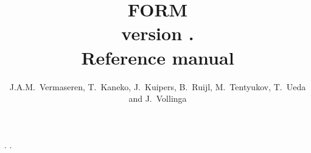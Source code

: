 \documentclass[11pt]{report}
\newcommand{\emptypage}{\newpage \thispagestyle{empty} \tiny{.} \normalsize}
\newcommand{\clearemptydoublepage}{\newpage{\pagestyle{empty}\cleardoublepage}}
\begin{document}
\begin{titlepage}
\title{\Huge FORM \\ \Large version \formmajorversion.\formminorversion \\
  \huge Reference manual}
\date{\formdate}
\author{J.A.M.~Vermaseren, T.~Kaneko, J.~Kuipers, B.~Ruijl, M.~Tentyukov, T.~Ueda and J.~Vollinga}
\end{titlepage}
\maketitle

\setcounter{page}{2}
\clearemptydoublepage
\emptypage
\clearemptydoublepage
{}
\setcounter{page}{1}
\clearemptydoublepage
\tableofcontents
\clearemptydoublepage
\emptypage
\clearemptydoublepage
{}
\setcounter{page}{1}
%





















%
\printindex
\end{document}
